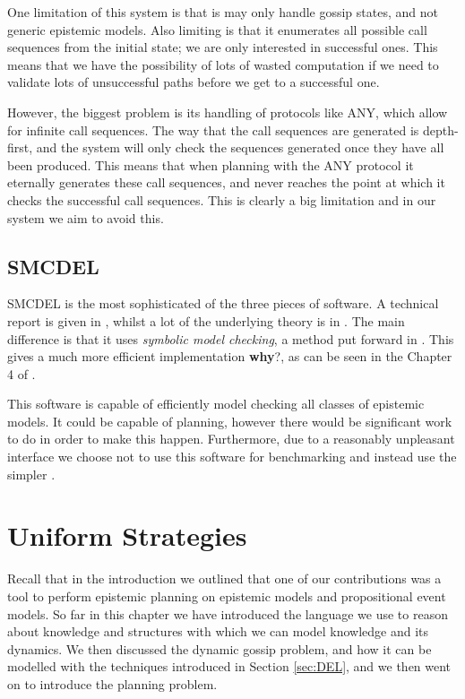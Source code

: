 \documentclass[ %
                    author={Leo Poulson},
                supervisor={Dr. Steven Ramsay},
                    degree={BSc},
                     title={Epistemic Planning for the Dynamic Gossip problem},
                  subtitle={},
                      year={2019} ]{dissertation}
\begin{document}
One limitation of this system is that is may only handle gossip states, and not
generic epistemic models. Also limiting is that it enumerates all possible call
sequences from the initial state; we are only interested in successful ones.
This means that we have the possibility of lots of wasted computation if we need
to validate lots of unsuccessful paths before we get to a successful one.

However, the biggest problem is its handling of protocols like \textsf{ANY},
which allow for infinite call sequences. The way that the call sequences are
generated is depth-first, and the system will only check the sequences generated
once they have all been produced. This means that when planning with the
\textsf{ANY} protocol it eternally generates these call sequences, and never
reaches the point at which it checks the successful call sequences. This is
clearly a big limitation and in our system we aim to avoid this.

\subsection{SMCDEL}

SMCDEL is the most sophisticated of the three pieces of software. A technical
report is given in \cite{SMCDEL}, whilst a lot of the underlying theory is in
\cite{MalvinThesis}. The main difference is that it uses \emph{symbolic model
  checking}, a method put forward in \cite{SymbolicModelChecking}. This gives a
much more efficient implementation \textbf{why}?, as can be seen in the
Chapter 4 of \cite{MalvinThesis}.

This software is capable of efficiently model checking all classes of epistemic
models. It could be capable of planning, however there would be significant work
to do in order to make this happen. Furthermore, due to a reasonably unpleasant
interface we choose not to use this software for benchmarking and instead use
the simpler \cite{GithubGossip}.

\section{Uniform Strategies}
\label{sec:UniformStrategies}

Recall that in the introduction we outlined that one of our contributions was a
tool to perform epistemic planning on epistemic models and propositional event
models. So far in this chapter we have introduced the language we use to reason
about knowledge and structures with which we can model knowledge and its
dynamics. We then discussed the dynamic gossip problem, and how it can be
modelled with the techniques introduced in Section \ref{sec:DEL}, and we then
went on to introduce the planning problem. 
\end{document}
